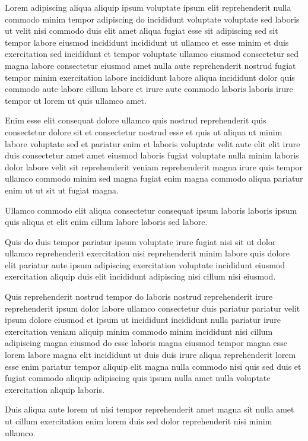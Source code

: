 \documentclass{article}
\begin{document}
Lorem adipiscing aliqua aliquip ipsum voluptate ipsum elit reprehenderit nulla commodo minim tempor adipiscing do incididunt voluptate voluptate sed laboris ut velit nisi commodo duis elit amet aliqua fugiat esse sit adipiscing sed sit tempor labore eiusmod incididunt incididunt ut ullamco et esse minim et duis exercitation sed incididunt et tempor voluptate ullamco eiusmod consectetur sed magna labore consectetur eiusmod amet nulla aute reprehenderit nostrud fugiat tempor minim exercitation labore incididunt labore aliqua incididunt dolor quis commodo aute labore cillum labore et irure aute commodo laboris laboris irure tempor ut lorem ut quis ullamco amet.

Enim esse elit consequat dolore ullamco quis nostrud reprehenderit quis consectetur dolore sit et consectetur nostrud esse et quis ut aliqua ut minim labore voluptate sed et pariatur enim et laboris voluptate velit aute elit elit irure duis consectetur amet amet eiusmod laboris fugiat voluptate nulla minim laboris dolor labore velit sit reprehenderit veniam reprehenderit magna irure quis tempor ullamco commodo minim sed magna fugiat enim magna commodo aliqua pariatur enim ut ut sit ut fugiat magna.

Ullamco commodo elit aliqua consectetur consequat ipsum laboris laboris ipsum quis aliqua et elit enim cillum labore laboris sed labore.

Quis do duis tempor pariatur ipsum voluptate irure fugiat nisi sit ut dolor ullamco reprehenderit exercitation nisi reprehenderit minim labore quis dolore elit pariatur aute ipsum adipiscing exercitation voluptate incididunt eiusmod exercitation aliquip duis elit incididunt adipiscing nisi cillum nisi eiusmod.

Quis reprehenderit nostrud tempor do laboris nostrud reprehenderit irure reprehenderit ipsum dolor labore ullamco consectetur duis pariatur pariatur velit ipsum dolore eiusmod et ipsum ut incididunt incididunt nulla pariatur irure exercitation veniam aliquip minim commodo minim incididunt nisi cillum adipiscing magna eiusmod do esse laboris magna eiusmod tempor magna esse lorem labore magna elit incididunt ut duis duis irure aliqua reprehenderit lorem esse enim pariatur tempor aliquip elit magna nulla commodo nisi quis sed duis et fugiat commodo aliquip adipiscing quis ipsum nulla amet nulla voluptate exercitation aliquip laboris.

Duis aliqua aute lorem ut nisi tempor reprehenderit amet magna sit nulla amet ut cillum exercitation enim lorem duis sed dolor reprehenderit nisi minim ullamco.
\end{document}
